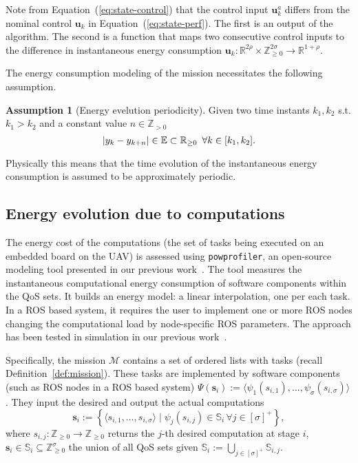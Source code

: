 \documentclass[letterpaper,10pt,conference]{ieeeconf}
\newcommand{\stt}[1]{{\small\tt #1}} %
\newcommand{\powprof}{\stt{powprofiler}}
\DeclarePairedDelimiter\abs{\lvert}{\rvert}%
\theoremstyle{definition}
\newtheorem{assm}[thm]{Assumption}
\begin{document}
Note from Equation~(\ref{eq:state-control}) that the control input $\mathbf{u}_k^a$ differs from the nominal control $\mathbf{u}_k$ in Equation~(\ref{eq:state-perf}). The first is an output of the algorithm. The second is a function that maps two consecutive control inputs to the difference in instantaneous energy consumption $\mathbf{u}_k:\mathbb{R}^{2\rho}\times\mathbb{Z}_{\geq 0}^{2\sigma}\rightarrow\mathbb{R}^{1+\rho}$.

The energy consumption modeling of the mission necessitates the following assumption.
\begin{assm}[Energy evelution periodicity]\label{assm:periodic} 
Given two time instants $k_1,k_2$ s.t. $k_1>k_2$ and a constant value $n\in\mathbb{Z}_{> 0}$
\begin{equation}
  \abs{y_{k}-y_{k+n}}\in\mathbb{E}\subset\mathbb{R}_{\geq 0} \,\,\,\forall k\in[k_1,k_2].
\end{equation}
\end{assm}

Physically this means that the time evolution of the instantaneous energy consumption is assumed to be approximately periodic.

\subsection{Energy evolution due to computations}
\label{sec:computations-model}

The energy cost of the computations (the set of tasks being executed on an embedded board on the UAV) is assessed using \powprof{}, an open-source modeling tool presented in our previous work~\cite{seewald2019coarse}. The tool measures the instantaneous computational energy consumption of software components within the QoS sets. It builds an energy model: a linear interpolation, one per each task. In a ROS based system, it requires the user to implement one or more ROS nodes changing the computational load by node-specific ROS parameters. The approach has been tested in simulation in our previous work~\cite{zamanakos2020energy}.

Specifically, the mission $\mathcal{M}$ contains a set of ordered lists with tasks (recall Definition~\ref{def:mission}). These tasks are implemented by software components (such as ROS nodes in a ROS based system) $\Psi(\mathbf{s}_i):=\langle\psi_1(s_{i,1}),\dots,\psi_\sigma(s_{i,\sigma})\rangle$. They input the desired and output the actual computations
\begin{equation}\label{eq:qos-def}
  \mathbf{s}_i:=\left\{\langle s_{i,1},\dots ,s_{i,\sigma}\rangle\mid \psi_j(s_{i,j})\in\mathbb{S}_{i}\,\forall j\in[\sigma]^+\right\},
\end{equation}
where $s_{i,j}:\mathbb{Z}_{\geq 0}\rightarrow\mathbb{Z}_{\geq 0}$ returns the $j$-th desired computation at stage $i$, $\mathbf{s}_i\in\mathbb{S}_i\subseteq\mathbb{Z}_{\geq 0}^\sigma$ the union of all QoS sets given $\mathbb{S}_i:=\bigcup_{j\in[\sigma]^+}{\mathbb{S}_{i,j}}$.
\end{document}
